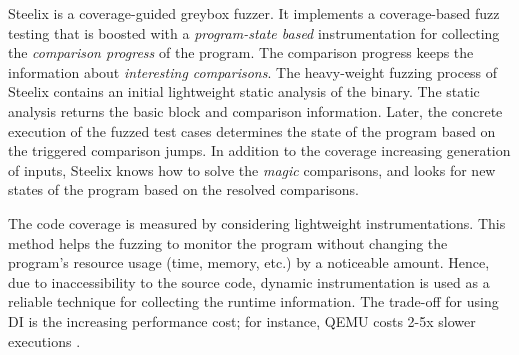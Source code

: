 Steelix \cite{li2017steelix} is a coverage-guided greybox fuzzer. It implements a coverage-based fuzz testing that is boosted with a \textit{program-state based} instrumentation for collecting the \textit{comparison progress} of the program. The comparison progress keeps the information about \textit{interesting comparisons}. The heavy-weight fuzzing process of Steelix contains an initial lightweight static analysis of the binary. The static analysis returns the basic block and comparison information. Later, the concrete execution of the fuzzed test cases determines the state of the program based on the triggered comparison jumps. In addition to the coverage increasing generation of inputs, Steelix knows how to solve the \textit{magic} comparisons, and looks for new states of the program based on the resolved comparisons.

The code coverage is measured by considering lightweight instrumentations. This method helps the fuzzing to monitor the program without changing the program's resource usage (time, memory, etc.) by a noticeable amount. Hence, due to inaccessibility to the source code, dynamic instrumentation is used as a reliable technique for collecting the runtime information. The trade-off for using DI is the increasing performance cost; for instance, QEMU costs 2-5x slower executions \cite{afl_qemu}.

